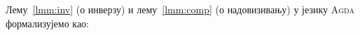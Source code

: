 Лему~\ref{lmm:inv} (о инверзу) и лему~\ref{lmm:comp} (о надовизивању) у језику \textsc{Agda} формализујемо као:
\begin{code}%
\>[0]%
\>[1147I]\AgdaSymbol{:}\AgdaSpace{}%
\AgdaSymbol{\{}\AgdaSpace{}%
\AgdaSymbol{:}\AgdaSpace{}%
\AgdaSpace{}%
\AgdaSpace{}%
\AgdaSymbol{\}}\AgdaSpace{}%
\AgdaSymbol{\{}\AgdaSpace{}%
\AgdaSpace{}%
\AgdaSymbol{:}\AgdaSpace{}%
\AgdaSymbol{\}}\<%
\\
\>[.][@{}l@{}]\<[1147I]%
\>[4]\AgdaSpace{}%
\AgdaSpace{}%
\AgdaOperator{\AgdaFunction{==}}\AgdaSpace{}%
\AgdaSpace{}%
\AgdaSpace{}%
\AgdaSpace{}%
\AgdaOperator{\AgdaFunction{==}}\AgdaSpace{}%
\<%
\\
\>[0]\AgdaSymbol{(}\AgdaSpace{}%
\AgdaSymbol{)}\AgdaSpace{}%
\AgdaSpace{}%
\AgdaSymbol{=}\AgdaSpace{}%
\AgdaSpace{}%
\<%
\\
%
\\[\AgdaEmptyExtraSkip]%
\>[0]\AgdaSpace{}%
\AgdaSpace{}%
\<%
\\
%
\\[\AgdaEmptyExtraSkip]%
\>[0]%
\>[1171I]\AgdaSymbol{:}\AgdaSpace{}%
\AgdaSymbol{\{}\AgdaSpace{}%
\AgdaSymbol{:}\AgdaSpace{}%
\AgdaSpace{}%
\AgdaSpace{}%
\AgdaSymbol{\}}\AgdaSpace{}%
\AgdaSymbol{\{}\AgdaSpace{}%
\AgdaSpace{}%
\AgdaSpace{}%
\AgdaSymbol{:}\AgdaSpace{}%
\AgdaSymbol{\}}\<%
\\
\>[.][@{}l@{}]\<[1171I]%
\>[4]\AgdaSpace{}%
\AgdaSpace{}%
\AgdaOperator{\AgdaFunction{==}}\AgdaSpace{}%
\AgdaSpace{}%
\AgdaSpace{}%
\AgdaSpace{}%
\AgdaOperator{\AgdaFunction{==}}\AgdaSpace{}%
\AgdaSpace{}%
\AgdaSpace{}%
\AgdaSpace{}%
\AgdaOperator{\AgdaFunction{==}}\AgdaSpace{}%
\<%
\\
\>[0]\AgdaSpace{}%
\AgdaSymbol{\AgdaUnderscore{}}\AgdaSpace{}%
\AgdaSpace{}%
\AgdaSpace{}%
\AgdaSymbol{=}\AgdaSpace{}%
\<%
\end{code}
